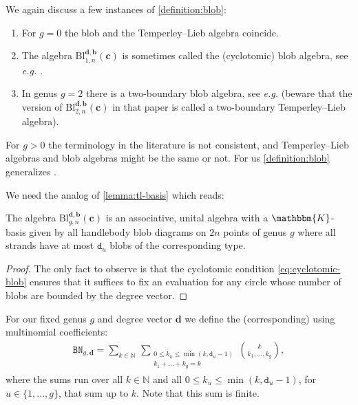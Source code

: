 \documentclass[a4paper,11pt]{amsart}
\let\emph\relax
\newcommand{\eg}{\textsl{e.g.}}
\renewcommand{\dots}{\text{...}}
\newcommand{\setstuff}[1]{\mathrm{#1}}
\newcommand{\KK}{\mathbbm{K}}
\newcommand{\N}{\mathbb{N}}
\newcommand{\bsym}[1]{\boldsymbol{#1}}
\newcommand{\varsym}[1]{\mathtt{#1}}
\newcommand{\cpar}{\bsym{c}}
\newcommand{\bpar}{\bsym{b}}
\newcommand{\dpar}{\bsym{d}}
\newcommand{\dvar}{\varsym{d}}
\newcommand{\bbvar}{\varsym{BN}}
\numberwithin{equation}{section}
\let\fullref\autoref
\begin{document}
\begin{remark}\label{remark:blob}
We again discuss a few instances of \fullref{definition:blob}:
\begin{enumerate}

\setlength\itemsep{0.15cm}

\item For $g=0$ the blob and the Temperley--Lieb algebra 
coincide.

\item The algebra $\setstuff{Bl}_{1,n}^{\dpar,\bpar}(\cpar)$ 
is sometimes called the (cyclotomic) blob algebra, see {\eg} \cite{MaSa-blob}.

\item In genus $g=2$ there is a two-boundary 
blob algebra, see {\eg} 
\cite{deGiNi-two-boundary-tl} (beware that the version of $\setstuff{Bl}_{2,n}^{\dpar,\bpar}(\cpar)$ 
in that paper is called a two-boundary 
Temperley--Lieb algebra).

\end{enumerate}
For $g>0$
the terminology in the literature is not consistent, and 
Temperley--Lieb algebras and blob algebras might 
be the same or not. For us \fullref{definition:blob} 
generalizes \cite{MaSa-blob}.
\end{remark}

We need the 
analog of \fullref{lemma:tl-basis} which reads:

\begin{lemma}\label{lemma:blob-basis}
The algebra 
$\setstuff{Bl}_{g,n}^{\dpar,\bpar}(\cpar)$ is an associative, unital 
algebra with a $\KK$-basis given by all handlebody blob diagrams 
on $2n$ points of genus 
$g$ where all strands have at most $\dvar_{u}$ 
blobs of the corresponding type.
\end{lemma}

\begin{proof}
The only fact to observe is that 
the cyclotomic condition \eqref{eq:cyclotomic-blob} 
ensures that it suffices to 
fix an evaluation for any circle whose number of blobs are bounded 
by the degree vector.
\end{proof}

For our fixed genus $g$ and degree vector $\dpar$ we define 
the (corresponding) \emph{blob numbers} using multinomial
coefficients:
\begin{gather}\label{eq:blob-numbers}
\bbvar_{g,\dpar}=
\sum_{k\in\N}\,
\sum_{\substack{0\leq k_{u}\leq\min(k,\dvar_{u}-1)\\k_{1}+\dots+k_{g}=k}}
\binom{k}{k_{1},\dots,k_{g}},
\end{gather}
where the sums run over all $k\in\N$ and all 
$0\leq k_{u}\leq\min(k,\dvar_{u}-1)$,
for $u\in\{1,\dots,g\}$, that sum up to $k$.
Note that this sum is finite.
\end{document}
